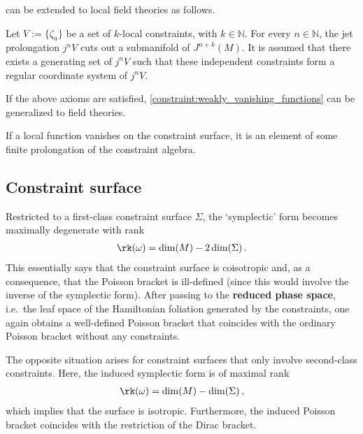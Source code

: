      can be extended to local field theories as follows.
    \begin{axiom}
        Let $V:=\{\zeta_a\}$ be a set of $k$-local constraints, with $k\in\mathbb{N}$. For every $n\in\mathbb{N}$, the jet prolongation $j^nV$ cuts out a submanifold of $J^{n+k}(M)$. It is assumed that there exists a generating set of $j^nV$ such that these independent constraints form a regular coordinate system of $j^nV$.
    \end{axiom}

    If the above axioms are satisfied, \cref{constraint:weakly_vanishing_functions} can be generalized to field theories.
    \begin{property}
        If a local function vanishes on the constraint surface, it is an element of some finite prolongation of the constraint algebra.
    \end{property}

\subsection{Constraint surface}

    \begin{property}
        Restricted to a first-class constraint surface $\Sigma$, the `symplectic' form becomes maximally degenerate with rank
        \begin{gather}
            \rk(\omega) = \dim(M) - 2\dim(\Sigma)\,.
        \end{gather}
        This essentially says that the constraint surface is coisotropic and, as a consequence, that the Poisson bracket is ill-defined (since this would involve the inverse of the symplectic form). After passing to the \textbf{reduced phase space}, i.e.~the leaf space of the Hamiltonian foliation generated by the constraints, one again obtains a well-defined Poisson bracket that coincides with the ordinary Poisson bracket without any constraints.

        The opposite situation arises for constraint surfaces that only involve second-class constraints. Here, the induced symplectic form is of maximal rank
        \begin{gather}
            \rk(\omega) = \dim(M) - \dim(\Sigma)\,,
        \end{gather}
        which implies that the surface is isotropic. Furthermore, the induced Poisson bracket coincides with the restriction of the Dirac bracket.
    \end{property}

